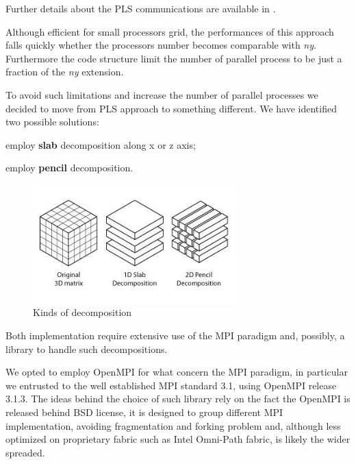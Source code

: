 Further details about the PLS communications are available in \cite[\nopp chapter 4.2]{ns:quadrio}. \\
 \par
Although efficient for small processors grid, the performances of this approach falls quickly whether the processors number becomes comparable with \emph{ny}.  Furthermore the code structure limit the number of parallel process to be just a fraction of the \emph{ny} extension. \\
\par
To avoid such limitations and increase the number of parallel processes we decided to move from PLS approach to something different.
We have identified two possible solutions:
\begin{description}
  \item employ \textbf{slab} decomposition along x or z axis;
  \item employ \textbf{pencil} decomposition.
\end{description}
\begin{figure}
\begin{center}
\includegraphics[width=0.7\textwidth]{grafici/decomp_example}
\caption{Kinds of decomposition}
\label{decomposition:example}
\end{center}
\end{figure}
Both implementation require extensive use of the MPI paradigm and, possibly, a library to handle such decompositions.
\par
We opted to employ OpenMPI\cite{openmpi} for what concern the MPI paradigm, in particular we entrusted to the well established MPI standard 3.1\cite{MPI:standard}, using OpenMPI release 3.1.3.
The ideas behind the choice of such library rely on the fact the OpenMPI is released behind BSD license\cite{bsd:license}, it is designed to group different MPI implementation, avoiding fragmentation and forking problem\cite{faq:openmpi} and, although less optimized on proprietary fabric such as Intel Omni-Path fabric\cite{intel:omnipath}\cite{intel:intelmpivsopenmpi}, is likely the wider spreaded.
